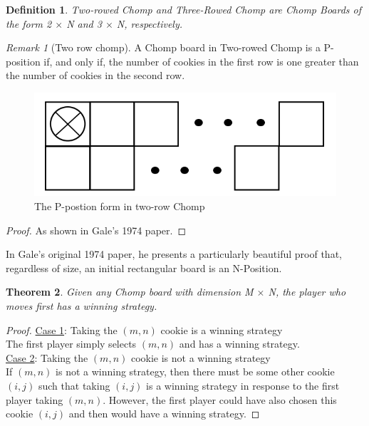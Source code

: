 \documentclass{amsart}
\newtheorem{thm}{Theorem}
\newtheorem{term}{Definition} %
\theoremstyle{definition}
\theoremstyle{remark}
\newtheorem{rem}[thm]{Remark}
\numberwithin{equation}{section}
\begin{document}
\begin{term}
Two-rowed Chomp and Three-Rowed Chomp are Chomp Boards of the form 2 $\times$ N and 3 $\times$ N, respectively.
\end{term}

\begin{rem}[Two row chomp]
\label{2row}
A Chomp board in Two-rowed Chomp is a P-position if, and only if, the number of cookies in the first row is one greater than the number of cookies in the second row.
\end{rem}
\begin{figure}[2row]
\includegraphics[scale=0.25]{Images/2_row_chomp_v2.png}
\caption{The P-postion form in two-row Chomp}
\end{figure}
\begin{proof}
As shown in Gale's 1974 paper.\cite{Gale74}
\end{proof}



\noindent In Gale's original 1974 paper, he presents a particularly beautiful proof that, regardless of size, an initial rectangular board is an N-Position.

\begin{thm}
\label{stealing}
Given any Chomp board with dimension M $\times$ N, the player who moves first has a winning strategy.
\end{thm}
\begin{proof} \hfill \break
\underline{Case 1}: Taking the $(m,n)$ cookie is a winning strategy\\ 
The first player simply selects $(m,n)$ and has a winning strategy.\\
\underline{Case 2}: Taking the $(m,n)$ cookie is not a winning strategy\\
If $(m,n)$ is not a winning strategy, then there must be some other cookie $(i,j)$ such that taking $(i,j)$ is a winning strategy in response to the first player taking $(m,n)$. However, the first player could have also chosen this cookie $(i,j)$ and then would have a winning strategy.
\end{proof}
\end{document}
